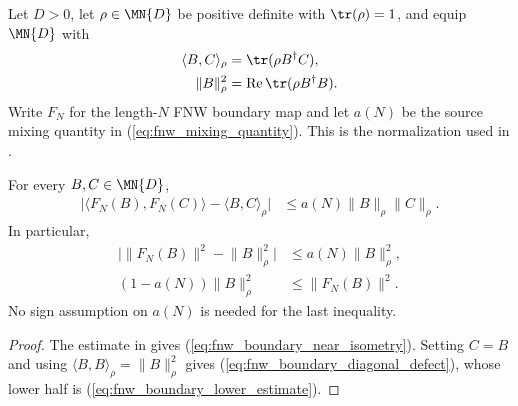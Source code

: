 Let $D>0$, let $\rho\in\MN{D}$ be positive definite with
$\tr(\rho)=1$, and equip $\MN{D}$ with
\begin{align}
    \langle B,C\rangle_\rho
     & =\tr(\rho B^\dagger C),
    \label{eq:fnw_weighted_inner}               \\
    \lVert B\rVert_\rho^2
     & =\operatorname{Re}\tr(\rho B^\dagger B).
    \label{eq:fnw_weighted_norm}
\end{align}
Write $F_N$ for the length-$N$ FNW boundary map and let $a(N)$ be the
source mixing quantity in (\ref{eq:fnw_mixing_quantity}). This is the
normalization used in
\cite[Equations~(5.9)--(5.10)]{Fannes1992Finitely}.

\begin{lemma}
    \label{thm:fnw_boundary_near_isometry}
    \leanok
    For every $B,C\in\MN{D}$,
    \begin{align}
        \bigl|\langle F_N(B),F_N(C)\rangle
        -\langle B,C\rangle_\rho\bigr|
         & \leq a(N)\lVert B\rVert_\rho\lVert C\rVert_\rho.
        \label{eq:fnw_boundary_near_isometry}
    \end{align}
    In particular,
    \begin{align}
        \bigl|\lVert F_N(B)\rVert^2-\lVert B\rVert_\rho^2\bigr|
         & \leq a(N)\lVert B\rVert_\rho^2,
        \label{eq:fnw_boundary_diagonal_defect} \\
        (1-a(N))\lVert B\rVert_\rho^2
         & \leq\lVert F_N(B)\rVert^2.
        \label{eq:fnw_boundary_lower_estimate}
    \end{align}
    No sign assumption on $a(N)$ is needed for the last inequality.
\end{lemma}

\begin{proof}
    \leanok
    The estimate in \cite[Equation~(5.9)]{Fannes1992Finitely} gives
    (\ref{eq:fnw_boundary_near_isometry}). Setting $C=B$ and using
    $\langle B,B\rangle_\rho=\lVert B\rVert_\rho^2$ gives
    (\ref{eq:fnw_boundary_diagonal_defect}), whose lower half is
    (\ref{eq:fnw_boundary_lower_estimate}).
\end{proof}

